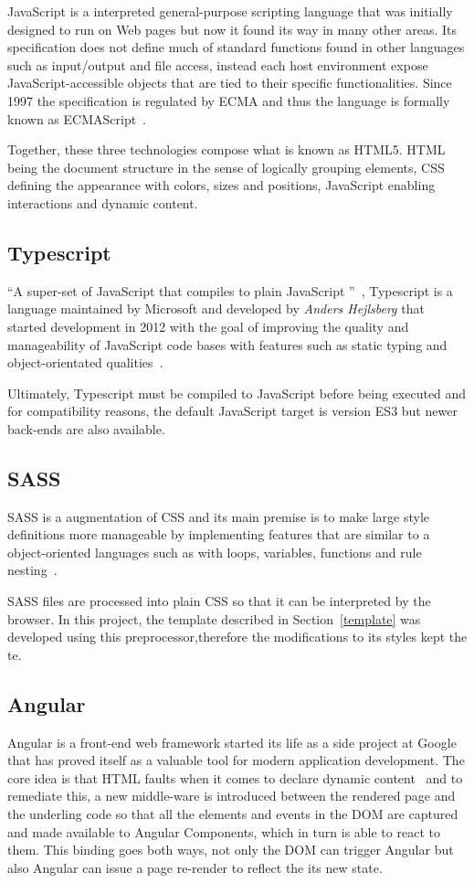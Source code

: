 JavaScript is a interpreted general-purpose scripting language that was initially designed to run on Web pages but now it found its way in many other areas\cite{js}. Its specification does not define much of standard functions found in other languages such as input/output and file access, instead each host environment expose JavaScript-accessible objects that are tied to their specific functionalities. Since 1997 the specification is regulated by \gls{ECMA} and thus the language is formally known as ECMAScript~\cite{ecma}.

Together, these three technologies compose what is known as \gls{HTML}5. \gls{HTML} being the document structure in the sense of logically grouping elements, \gls{CSS} defining the appearance with colors, sizes and positions, JavaScript enabling interactions and dynamic content.

\subsection{Typescript}
``A super-set of JavaScript that compiles to plain JavaScript ''~\cite{tswebsite}, Typescript is a language maintained by Microsoft and developed by \textit{Anders Hejlsberg} that started development in 2012 with the goal of improving the quality and manageability of JavaScript code bases with features such as static typing and object-orientated qualities~\cite{tsrevealed}.

Ultimately, Typescript must be compiled to JavaScript before being executed and for compatibility reasons, the default JavaScript target is version ES3 but newer back-ends are also available.

\subsection{SASS}
\gls{SASS} is a augmentation of CSS and its main premise is to make large style definitions more manageable by implementing features that are similar to a object-oriented languages such as  with loops, variables, functions and rule nesting~\cite{sass}. 

\gls{SASS} files are processed into plain \gls{CSS} so that it can be interpreted by the browser. In this project, the template described in Section~\ref{template} was developed using this preprocessor,therefore the modifications to its styles kept the te.

\subsection{Angular}\label{concept:angular}
Angular is a front-end web framework started its life as a side project at Google that has proved itself as a valuable tool for modern application development. The core idea is that \gls{HTML} faults when it comes to declare dynamic content~\cite{angularjs} and to remediate this, a new middle-ware is introduced between the rendered page and the underling code so that all the elements and events in the \gls{DOM} are captured and made available to Angular Components, which in turn is able to react to them. This binding goes both ways, not only the \gls{DOM} can trigger Angular but also Angular can issue a page re-render to reflect the its new state.

